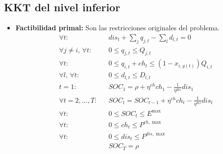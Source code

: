 \documentclass[a4paper,11pt]{article}
\begin{document}
\subsection{KKT del nivel inferior}
\begin{itemize}

    \item \textbf{Factibilidad primal:}
    Son las restricciones originales del problema.
    \begin{align}
        &\forall t: && dis_t + \sum_{j} q_{j,t} - \sum_{l} d_{l,t} = 0 \\
        &\forall j \neq i,\, \forall t: && 0 \leq q_{j,t} \leq Q_{j,t} \\
        &\forall t: && 0 \leq q_{i,t} + ch_t \leq (1-x_{i,y(t)}) Q_{i,t} \\
        &\forall l,\, \forall t: && 0 \leq d_{l,t} \leq D_{l,t} \\
        & t=1: && SOC_1 = \rho + \eta^{ch} ch_1 - \frac{1}{\eta^{dis}} dis_1 \\
        &\forall t=2,\dots,T: && SOC_t = SOC_{t-1} + \eta^{ch} ch_t - \frac{1}{\eta^{dis}} dis_t \\
        &\forall t: && 0 \leq SOC_t \leq E^{\max} \\
        &\forall t: && 0 \leq ch_t \leq P^{ch,\max} \\
        &\forall t: && 0 \leq dis_t \leq P^{dis,\max} \\
        & && SOC_T = \rho
    \end{align}



\end{itemize}
\end{document}
